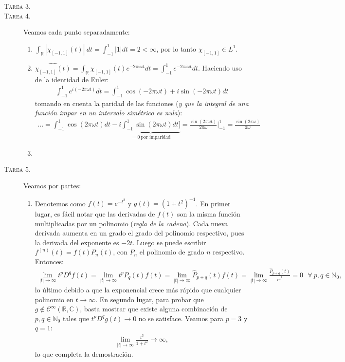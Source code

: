 \documentclass[spanish, fleqn]{article}
\begin{document}
\begin{description}
	\item[\textsc{Tarea 3.}]




	\item[\textsc{Tarea 4.}] Veamos cada punto separadamente:
	\begin{enumerate}
		\item $\displaystyle \int_{\mathbb{R}} |\chi_{[-1,1]}(t)|\ dt = \int_{-1}^{1} |1| dt = 2 < \infty$, por lo tanto $\chi_{[-1,1]} \in L^1$.
		\item $\displaystyle \widehat{\chi_{[-1,1]}(t)} = \int_{\mathbb{R}} \chi_{[-1,1]}(t) e^{-2 \pi i \omega t} dt = \int_{-1}^{1} e^{-2 \pi i \omega t} dt$. Haciendo uso de la identidad de Euler:
		\begin{align*}
			\int_{-1}^{1} e^{i (-2 \pi \omega t)} dt = \int_{-1}^{1} \cos(-2 \pi \omega t) + i \sin(-2 \pi \omega t) dt
		\end{align*}
		tomando en cuenta la paridad de las funciones (\textit{y que la integral de una función impar en un intervalo simétrico es nula}):
		\begin{align*}
			\ldots = \int_{-1}^{1} \cos(2 \pi \omega t) dt - i \underbrace{\int_{-1}^{1} \sin(2 \pi \omega t) dt]}_{= 0 \ \text{por imparidad}} = \frac{\sin(2 \pi \omega t)}{2 \pi \omega} \bigg|_{-1}^{1} = \frac{\sin(2 \pi \omega)}{\pi \omega}
		\end{align*}
		\item

	\end{enumerate}




	\item[\textsc{Tarea 5.}] Veamos por partes:
	\begin{enumerate}
		\item Denotemos como $\displaystyle f(t)=e^{-t^2}$ y $\displaystyle g(t)=(1+t^2)^{-1}$. En primer lugar, es fácil notar que las derivadas de $f(t)$ son la misma función multiplicadas por un polinomio (\textit{regla de la cadena}). Cada nueva derivada aumenta en un grado el grado del polinomio respectivo, pues la derivada del exponente es $-2t$.
		Luego se puede escribir $f^{(n)}(t)=f(t)P_n(t)$, con $P_n$ el polinomio de grado $n$ respectivo. Entonces:
		\begin{align*}
			\lim_{|t|\rightarrow \infty} t^p D^q f(t) = \lim_{|t|\rightarrow \infty} t^p P_q(t) f(t) = \lim_{|t|\rightarrow \infty} \widehat{P}_{p+q}(t) f(t) = \lim_{|t|\rightarrow \infty} \frac{\widehat{P}_{p+q}(t)}{e^{t^2}} = 0 \ \ \ \forall \ p,q \in \mathbb{N}_0,
		\end{align*}
		lo último debido a que la exponencial crece más rápido que cualquier polinomio en $t \rightarrow \infty$. En segundo lugar, para probar que $g \notin \mathcal{C}^{\infty}(\mathbb{R},\mathbb{C})$, basta mostrar que existe alguna combinación de $p,q \in \mathbb{N}_0$ tales que $t^p D^q g(t) \rightarrow 0$ no se satisface. Veamos para $p=3$ y $q=1$:
		\begin{align*}
			\lim_{|t|\rightarrow \infty} \frac{t^3}{1+t^2} \rightarrow \infty,
		\end{align*}
		lo que completa la demostración.


\end{enumerate}
\end{description}
\end{document}
